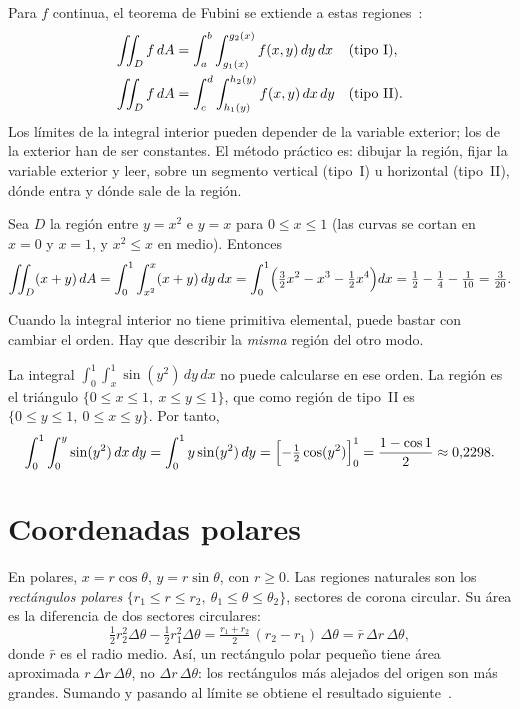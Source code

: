 Para $f$ continua, el teorema de Fubini se extiende a estas regiones~\cite[§11.12--11.14]{apostol2}:
\begin{align*}
\iint_Df\,dA&=\int_a^b\int_{g_1(x)}^{g_2(x)}f(x,y)\,dy\,dx&&\text{(tipo I)},\\
\iint_Df\,dA&=\int_c^d\int_{h_1(y)}^{h_2(y)}f(x,y)\,dx\,dy&&\text{(tipo II)}.
\end{align*}
Los límites de la integral interior pueden depender de la variable exterior; los de la exterior han de ser constantes. El método práctico es: dibujar la región, fijar la variable exterior y leer, sobre un segmento vertical (tipo~I) u horizontal (tipo~II), dónde entra y dónde sale de la región.

\begin{ejemplo}\label{ej:t6-region}
Sea $D$ la región entre $y=x^2$ e $y=x$ para $0\le x\le1$ (las curvas se cortan en $x=0$ y $x=1$, y $x^2\le x$ en medio). Entonces
\[
\iint_D(x+y)\,dA=\int_0^1\int_{x^2}^{x}(x+y)\,dy\,dx=\int_0^1\Bigl(\tfrac32x^2-x^3-\tfrac12x^4\Bigr)dx=\tfrac12-\tfrac14-\tfrac1{10}=\tfrac{3}{20}.
\]
\end{ejemplo}

Cuando la integral interior no tiene primitiva elemental, puede bastar con cambiar el orden. Hay que describir la \emph{misma} región del otro modo.

\begin{ejemplo}\label{ej:t6-orden}
La integral $\int_0^1\int_x^1\sin(y^2)\,dy\,dx$ no puede calcularse en ese orden. La región es el triángulo $\{0\le x\le1,\ x\le y\le1\}$, que como región de tipo~II es $\{0\le y\le1,\ 0\le x\le y\}$. Por tanto,
\[
\int_0^1\int_0^y\sin(y^2)\,dx\,dy=\int_0^1y\sin(y^2)\,dy=\Bigl[-\tfrac12\cos(y^2)\Bigr]_0^1=\frac{1-\cos1}{2}\approx0{,}2298 .
\]
\end{ejemplo}

\section{Coordenadas polares}

En polares, $x=r\cos\theta$, $y=r\sin\theta$, con $r\ge0$. Las regiones naturales son los \emph{rectángulos polares} $\{r_1\le r\le r_2,\ \theta_1\le\theta\le\theta_2\}$, sectores de corona circular. Su área es la diferencia de dos sectores circulares:
\[
\tfrac12r_2^2\Delta\theta-\tfrac12r_1^2\Delta\theta=\tfrac{r_1+r_2}{2}\,(r_2-r_1)\,\Delta\theta=\bar r\,\Delta r\,\Delta\theta ,
\]
donde $\bar r$ es el radio medio. Así, un rectángulo polar pequeño tiene área aproximada $r\,\Delta r\,\Delta\theta$, no $\Delta r\,\Delta\theta$: los rectángulos más alejados del origen son más grandes. Sumando y pasando al límite se obtiene el resultado siguiente~\cite[§11.26--11.31]{apostol2}.

